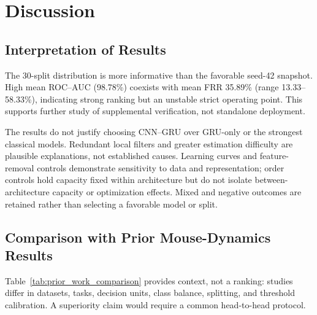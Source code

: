 \documentclass[conference]{IEEEtran}
\begin{document}
\section{Discussion}

\subsection{Interpretation of Results}

The 30-split distribution is more informative than the favorable seed-42
snapshot. High mean ROC--AUC (98.78\%) coexists with mean FRR 35.89\%
(range 13.33--58.33\%), indicating strong ranking but an unstable strict
operating point. This supports further study of supplemental verification,
not standalone deployment.

The results do not justify choosing CNN--GRU over GRU-only or the strongest
classical models. Redundant local filters and greater estimation difficulty
are plausible explanations, not established causes. Learning curves and
feature-removal controls demonstrate sensitivity to data and representation;
order controls hold capacity fixed within architecture but do not isolate
between-architecture capacity or optimization effects. Mixed and negative
outcomes are retained rather than selecting a favorable model or split.

\subsection{Comparison with Prior Mouse-Dynamics Results}

Table~\ref{tab:prior_work_comparison} provides context, not a ranking:
studies differ in datasets, tasks, decision units, class balance, splitting,
and threshold calibration. A superiority claim would require a common
head-to-head protocol.
\end{document}
